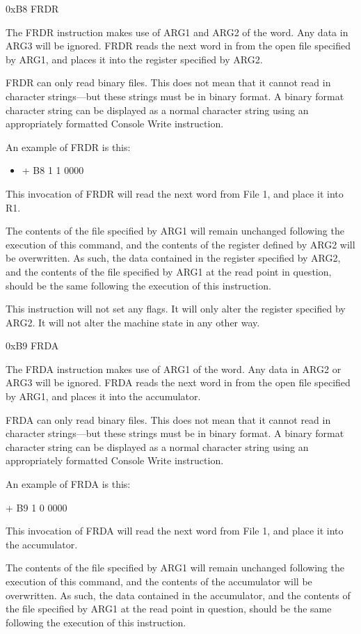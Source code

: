\documentclass[]{article}
\providecommand{\tightlist}{%
  \setlength{\itemsep}{0pt}\setlength{\parskip}{0pt}}
\begin{document}
0xB8 FRDR

The FRDR instruction makes use of ARG1 and ARG2 of the word. Any data in
ARG3 will be ignored. FRDR reads the next word in from the open file
specified by ARG1, and places it into the register specified by ARG2.

FRDR can only read binary files. This does not mean that it cannot read
in character strings---but these strings must be in binary format. A
binary format character string can be displayed as a normal character
string using an appropriately formatted Console Write instruction.

An example of FRDR is this:

\begin{itemize}
\tightlist
\item
  + B8 1 1 0000
\end{itemize}

This invocation of FRDR will read the next word from File 1, and place
it into R1.

The contents of the file specified by ARG1 will remain unchanged
following the execution of this command, and the contents of the
register defined by ARG2 will be overwritten. As such, the data
contained in the register specified by ARG2, and the contents of the
file specified by ARG1 at the read point in question, should be the same
following the execution of this instruction.

This instruction will not set any flags. It will only alter the register
specified by ARG2. It will not alter the machine state in any other way.

0xB9 FRDA

The FRDA instruction makes use of ARG1 of the word. Any data in ARG2 or
ARG3 will be ignored. FRDA reads the next word in from the open file
specified by ARG1, and places it into the accumulator.

FRDA can only read binary files. This does not mean that it cannot read
in character strings---but these strings must be in binary format. A
binary format character string can be displayed as a normal character
string using an appropriately formatted Console Write instruction.

An example of FRDA is this:

+ B9 1 0 0000

This invocation of FRDA will read the next word from File 1, and place
it into the accumulator.

The contents of the file specified by ARG1 will remain unchanged
following the execution of this command, and the contents of the
accumulator will be overwritten. As such, the data contained in the
accumulator, and the contents of the file specified by ARG1 at the read
point in question, should be the same following the execution of this
instruction.
\end{document}

